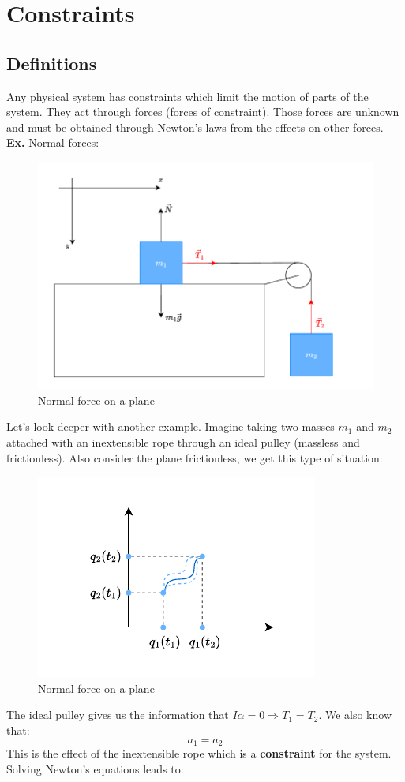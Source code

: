 \chapter{Constraints}
\section{Definitions}
Any physical system has constraints which limit the motion of parts of the system. They act through forces (forces of constraint). Those forces are unknown and must be obtained through Newton's laws from the effects on other forces.\\
\textbf{Ex.} Normal forces:
\begin{figure}[!ht]
    \centering
    \includegraphics[width=0.5\linewidth]{res/svg/idealpulley.drawio}
    \caption{Normal force on a plane}
    \label{fig:image6}
\end{figure}
Let's look deeper with another example. Imagine taking two masses $m_1$ and $m_2$ attached with an inextensible rope through an ideal pulley (massless and frictionless). Also consider the plane frictionless, we get this type of situation:
\begin{figure}[!ht]
    \centering
    \includegraphics[width=0.6\linewidth]{res/svg/leastactionpath.drawio}
    \caption{Normal force on a plane}
    \label{fig:image7}
\end{figure}
The ideal pulley gives us the information that $I\alpha = 0 \Rightarrow T_1 = T_2$. We also know that:
\[a_1 = a_2\]
This is the effect of the inextensible rope which is a \textbf{constraint} for the system. Solving Newton's equations leads to:
